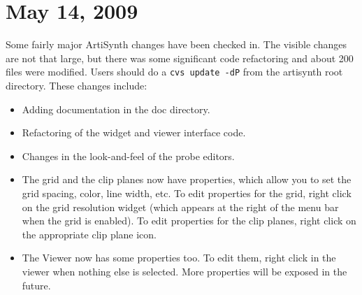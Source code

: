 \documentclass{article}
\begin{document}
\section*{May 14, 2009}

Some fairly major ArtiSynth changes have been checked in. The visible 
changes are not that large, but there was some significant code 
refactoring and about 200 files were modified. Users should do a
{\tt cvs update -dP} from the artisynth root directory. These changes 
include:

\begin{itemize}

\item Adding documentation in the doc directory.

\item Refactoring of the widget and viewer interface code.

\item Changes in the look-and-feel of the probe editors.

\item The grid and the clip planes now have properties, which allow you to 
set the grid spacing, color, line width, etc. To edit properties for 
the grid, right click on the grid resolution widget (which appears at 
the right of the menu bar when the grid is enabled). To edit
properties for the clip planes, right click on the appropriate clip
plane icon.

\item The Viewer now has some properties too. To edit them, right click in 
the viewer when nothing else is selected. More properties will be
exposed in the future.

\end{itemize}
\end{document}
